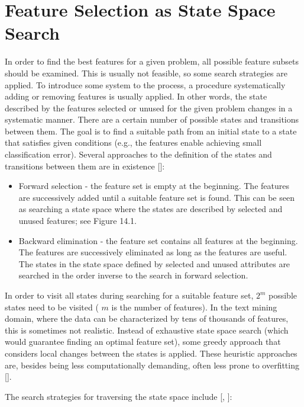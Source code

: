 \section{Feature Selection as State Space Search}
In order to find the best features for a given problem, all possible feature subsets should be examined. This is usually not feasible, so some search strategies are applied. To introduce some system to the process, a procedure systematically adding or removing features is usually applied. In other words, the state described by the features selected or unused for the given problem changes in a systematic manner. There are a certain number of possible states and transitions between them. The goal is to find a suitable path from an initial state to a state that satisfies given conditions (e.g., the features enable achieving small classification error). Several approaches to the definition of the states and transitions between them are in existence [\cite{ref27}]:

\begin{itemize}
  \item Forward selection - the feature set is empty at the beginning. The features are successively added until a suitable feature set is found. This can be seen as searching a state space where the states are described by selected and unused features; see Figure 14.1.
  \item Backward elimination - the feature set contains all features at the beginning. The features are successively eliminated as long as the features are useful. The states in the state space defined by selected and unused attributes are searched in the order inverse to the search in forward selection.
\end{itemize}

In order to visit all states during searching for a suitable feature set, $2^{m}$ possible states need to be visited ( $m$ is the number of features). In the text mining domain, where the data can be characterized by tens of thousands of features, this is sometimes not realistic. Instead of exhaustive state space search (which would guarantee finding an optimal feature set), some greedy approach that considers local changes between the states is applied. These heuristic approaches are, besides being less computationally demanding, often less prone to overfitting [\cite{ref175}].

The search strategies for traversing the state space include [\cite{ref137}, \cite{ref258}]:

